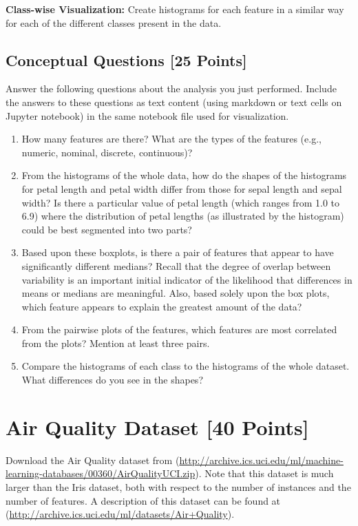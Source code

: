 \documentclass[letter-paper,12pt]{article} %
\begin{document}
\textbf{Class-wise Visualization:} Create histograms for each feature in a similar way for each of the different classes present in the data. \\

\subsection{Conceptual Questions [25 Points]}
Answer the following questions about the analysis you just performed. Include the answers to these questions as text content (using markdown or text cells on Jupyter notebook) in the same notebook file used for visualization.

\begin{enumerate}
    \item How many features are there? What are the types of the features (e.g., numeric, nominal, discrete, continuous)?
    
    \item From the histograms of the whole data, how do the shapes of the histograms for petal length and petal width differ from those for sepal length and sepal width? Is there a particular value of petal length (which ranges from 1.0 to 6.9) where the distribution of petal lengths (as illustrated by the histogram) could be best segmented into two parts?
    
    \item Based upon these boxplots, is there a pair of features that appear to have significantly different medians? Recall that the degree of overlap between variability is an important initial indicator of the likelihood that differences in means or medians are meaningful. Also, based solely upon the box plots, which feature appears to explain the greatest amount of the data?
    
    \item From the pairwise plots of the features, which features are most correlated from the plots? Mention at least three pairs. 
    
    \item Compare the histograms of each class to the histograms of the whole dataset. What differences do you see in the shapes? 
    
\end{enumerate}


\section{Air Quality Dataset [40 Points]}
Download the Air Quality dataset from  (\url{http://archive.ics.uci.edu/ml/machine-learning-databases/00360/AirQualityUCI.zip}). Note that this dataset is much larger than
the Iris dataset, both with respect to the number of instances and the number of features. A description of this dataset can be found at (\url{http://archive.ics.uci.edu/ml/datasets/Air+Quality}).
\end{document}
